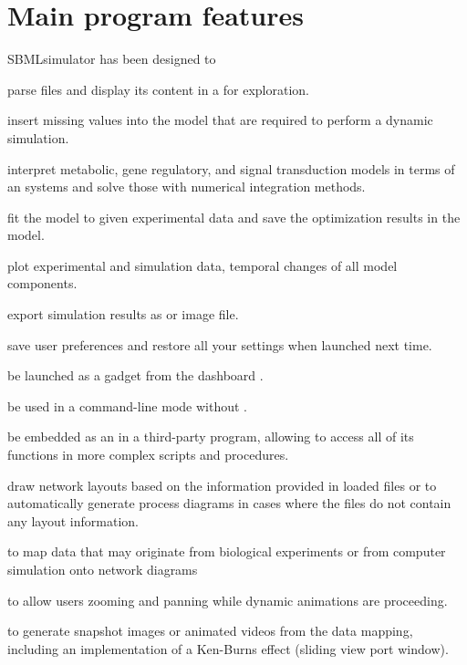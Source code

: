 \section{Main program features}

SBMLsimulator has been designed to
\begin{dinglist}{52}
\item parse \SBML files and display its content in a \GUI for exploration.
\item insert missing values into the model that are required to perform a dynamic simulation.
\item interpret metabolic, gene regulatory, and signal
transduction models in terms of an \ODE systems and solve those with numerical integration methods.
\item fit the model to given experimental data and save the optimization results in the model.
\item plot experimental and simulation data, \ie temporal changes of all model components.
\item export simulation results as \CSV or image file.
\item save user preferences and restore all your settings when launched next time.
\item be launched as a \Garuda gadget from the \Garuda dashboard \citep{Ghosh2011}.
\item be used in a command-line mode without \GUI.
\item be embedded as an \API in a third-party program, allowing to access all of its functions in more complex scripts and procedures.
\item draw network layouts based on the information provided in loaded \SBML files or to automatically generate \SBGN process diagrams in cases where the \SBML files do not contain any layout information.
\item to map data that may originate from biological experiments or from computer simulation onto \SBGN network diagrams
\item to allow users zooming and panning while dynamic animations are proceeding.
\item to generate snapshot images or animated videos from the data mapping, including an implementation of a Ken-Burns effect (sliding view port window).
\end{dinglist}


